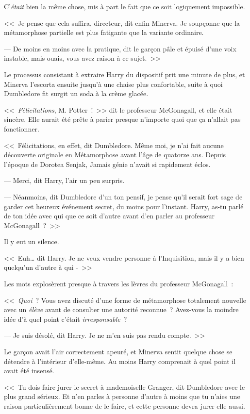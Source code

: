 C'\emph{était} bien la même chose, mis à part le fait que ce soit logiquement impossible.

<<~Je pense que cela suffira, directeur, dit enfin Minerva. Je soupçonne que la métamorphose partielle est plus fatigante que la variante ordinaire.

--- De moins en moins avec la pratique, dit le garçon pâle et épuisé d'une voix instable, mais ouais, vous avez raison à ce sujet.~>>

Le processus consistant à extraire Harry du dispositif prit une minute de plus, et Minerva l'escorta ensuite jusqu'à une chaise plus confortable, suite à quoi Dumbledore fit surgit un soda à la crème glacée.

<<~\emph{Félicitations}, M. Potter~!~>> dit le professeur McGonagall, et elle était sincère. Elle aurait été prête à parier presque n'importe quoi que ça n'allait pas fonctionner.

<<~Félicitations, en effet, dit Dumbledore. Même moi, je n'ai fait aucune découverte originale en Métamorphose avant l'âge de quatorze ans. Depuis l'époque de Dorotea Senjak, Jamais génie n'avait si rapidement éclos.

--- Merci, dit Harry, l'air un peu surpris.

--- Néanmoins, dit Dumbledore d'un ton pensif, je pense qu'il serait fort sage de garder cet heureux événement secret, du moins pour l'instant. Harry, as-tu parlé de ton idée avec qui que ce soit d'autre avant d'en parler au professeur McGonagall~?~>>

Il y eut un silence.

<<~Euh… dit Harry. Je ne veux vendre personne à l'Inquisition, mais il y a bien quelqu'un d'autre à qui -~>>

Les mots explosèrent presque à travers les lèvres du professeur McGonagall~:

<<~\emph{Quoi}~? Vous avez discuté d'une forme de métamorphose totalement nouvelle avec un \emph{élève} avant de consulter une autorité reconnue~? Avez-vous la moindre idée d'à quel point c'était \emph{irresponsable}~?

--- Je suis désolé, dit Harry. Je ne m'en suis pas rendu compte.~>>

Le garçon avait l'air correctement apeuré, et Minerva sentit quelque chose se détendre à l'intérieur d'elle-même. Au moins Harry comprenait à quel point il avait été insensé.

<<~Tu dois faire jurer le secret à mademoiselle Granger, dit Dumbledore avec le plus grand sérieux. Et n'en parles à personne d'autre à moins que tu n'aies une raison particulièrement bonne de le faire, et cette personne devra jurer elle aussi.

